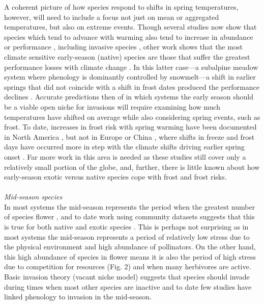 \documentclass[11pt,a4paper,oneside]{article}
\begin{document}
A coherent picture of how species respond to shifts in spring temperatures, however, will need to include a focus not just on mean or aggregated temperatures, but also on extreme events. Though several studies now show that species which tend to advance with warming also tend to increase in abundance or performance \citep{Cleland:2012vn}, including invasive species \citep{chuine2013}, other work shows that the most climate  sensitive early-season (native) species are those that suffer the greatest performance losses with climate change \citep{Inouye:2008gj}. In this latter case---a subalpine meadow system where phenology is dominantly controlled by snowmelt---a shift in earlier springs that did not coincide with a shift in frost dates produced the performance declines \citep{Inouye:2008gj}. Accurate predictions then of in which systems the early season should be a viable open niche for invasions will require examining how much temperatures have shifted on average while also considering spring events, such as frost. To date, increases in frost risk with spring warming have been documented in North America \citep{Inouye:2008gj,Augspurger2013}, but not in Europe \citep{Menzel2003a,Scheifinger2003} or China \citep{Dai2013}, where shifts in freeze and frost days have occurred more in step with the climate shifts driving earlier spring onset \citep{Dai2013}. Far more work in this area is needed as these studies still cover only a relatively small portion of the globe, and, further, there is little known about how early-season exotic versus native species cope with frost and frost risks.\\
\\
\noindent \emph{Mid-season species}\\
In most systems the mid-season represents the period when the greatest number of species flower \citep[e.g.,][]{Fitter:2002sm,Morales:2005ex,Miller-Rushing:2008zv,Aldridge:2011}, and to date work using community datasets suggests that this is true for both native and exotic species \citep{wolkovichAmBot2013}. This is perhaps not surprising as in most systems the mid-season represents a period of relatively low stress due to the physical environment and high abundance of pollinators. On the other hand, this high abundance of species in flower means it is also the period of high stress due to competition for resources (Fig. 2) and when many herbivores are active. Basic invasion theory (vacant niche model) suggests that species should invade during times when most other species are inactive \citep{wolkovich:2010fee} and to date few studies have linked phenology to invasion in the mid-season.\\
\end{document}
